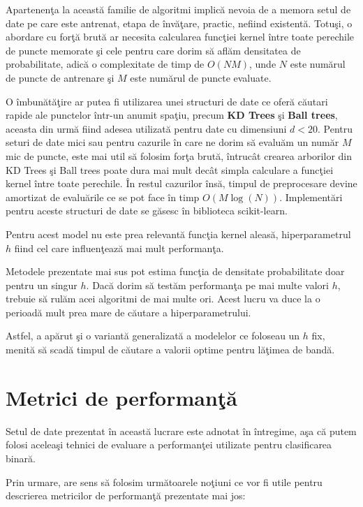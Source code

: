 Apartenenţa la această familie de algoritmi implică nevoia de a memora
setul de date pe care este antrenat, etapa de învăţare, practic, nefiind 
existentă. Totuşi, o abordare cu forţă brută ar necesita calcularea 
funcţiei kernel între toate perechile de puncte memorate şi cele pentru 
care dorim să aflăm densitatea de probabilitate, adică o complexitate de timp 
de $O(NM)$, unde $N$ este numărul de puncte de antrenare şi $M$ este numărul de puncte 
evaluate.

O îmbunătăţire ar putea fi utilizarea unei structuri de date ce oferă 
căutari rapide ale punctelor într-un anumit spaţiu, precum \textbf{KD Trees} 
şi \textbf{Ball trees}, aceasta din urmă fiind adesea utilizată pentru date cu 
dimensiuni $d < 20$. Pentru seturi de date mici sau pentru cazurile în care 
ne dorim să evaluăm un număr $M$ mic de puncte, este mai util să folosim forţa 
brută, întrucât crearea arborilor din KD Trees şi Ball trees 
poate dura mai mult decât simpla calculare a funcţiei kernel între toate 
perechile. În restul cazurilor însă, timpul de preprocesare devine amortizat 
de evaluările ce se pot face în timp $O(M\log(N))$. Implementări pentru 
aceste structuri de date se găsesc în biblioteca scikit-learn\cite{scikit-learn}.

Pentru acest model nu este prea relevantă funcţia kernel aleasă, 
hiperparametrul $h$ fiind cel care influenţează mai mult performanţa.

Metodele 
prezentate mai sus pot estima funcţia de densitate probabilitate doar 
pentru un singur $h$. Dacă dorim să testăm performanţa pe mai multe valori $h$, 
trebuie să rulăm acei algoritmi de mai multe ori. Acest lucru va duce la o perioadă 
mult prea mare de căutare a hiperparametrului. 

Astfel, a apărut şi o variantă generalizată a modelelor ce foloseau un 
$h$ fix, menită să scadă timpul de căutare a valorii optime pentru lăţimea 
de bandă\cite{Rapid-KDE}.

\section{Metrici de performanţă}

Setul de date prezentat în această lucrare este adnotat în întregime, aşa 
că putem folosi aceleaşi tehnici de evaluare a performanţei utilizate pentru
clasificarea binară.

Prin urmare, are sens să folosim următoarele noţiuni ce vor fi utile pentru
descrierea metricilor de performanţă prezentate mai jos:

